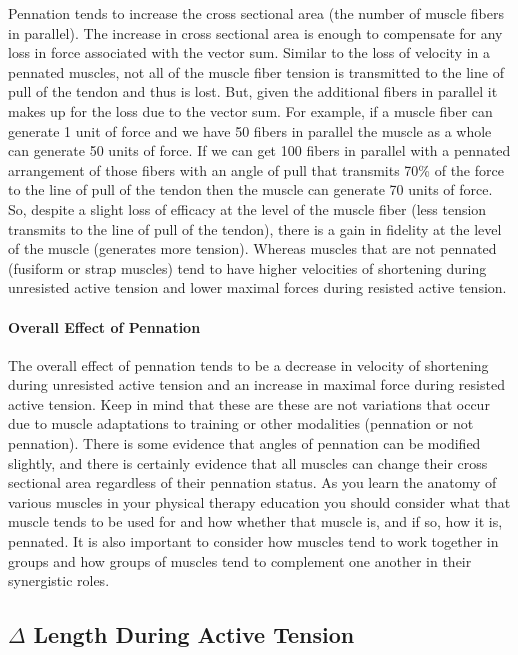 Pennation tends to increase the cross sectional area (the number of muscle fibers in parallel). The increase in cross sectional area is enough to compensate for any loss in force associated with the vector sum. Similar to the loss of velocity in a pennated muscles, not all of the muscle fiber tension is transmitted to the line of pull of the tendon and thus is lost. But, given the additional fibers in parallel it makes up for the loss due to the vector sum. For example, if a muscle fiber can generate 1 unit of force and we have 50 fibers in parallel the muscle as a whole can generate 50 units of force. If we can get 100 fibers in parallel with a pennated arrangement of those fibers with an angle of pull that transmits 70\% of the force to the line of pull of the tendon then the muscle can generate 70 units of force. So, despite a slight loss of efficacy at the level of the muscle fiber (less tension transmits to the line of pull of the tendon), there is a gain in fidelity at the level of the muscle (generates more tension). Whereas muscles that are not pennated (fusiform or strap muscles) tend to have higher velocities of shortening during unresisted active tension and lower maximal forces during resisted active tension.

\paragraph{Overall Effect of Pennation}
The overall effect of pennation tends to be a decrease in velocity of shortening during unresisted active tension and an increase in maximal force during resisted active tension. Keep in mind that these are these are not variations that occur due to muscle adaptations to training or other modalities (pennation or not pennation). There is some evidence that angles of pennation can be modified slightly, and there is certainly evidence that all muscles can change their cross sectional area regardless of their pennation status. As you learn the anatomy of various muscles in your physical therapy education you should consider what that muscle tends to be used for and how whether that muscle is, and if so, how it is, pennated. It is also important to consider how muscles tend to work together in groups and how groups of muscles tend to complement one another in their synergistic roles.

\subsection{$\Delta$ Length During Active Tension}

